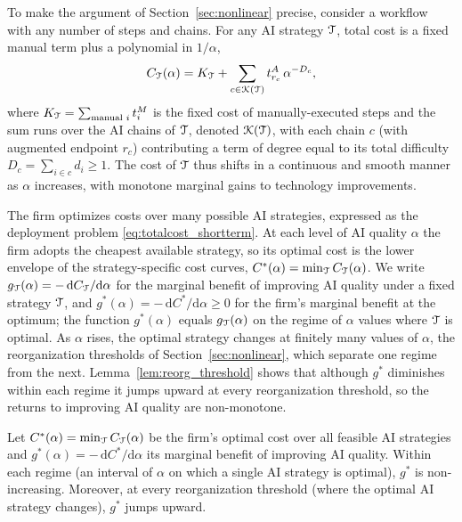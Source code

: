 To make the argument of Section~\ref{sec:nonlinear} precise, consider a workflow with any number of steps and chains.
For any AI strategy $\mathcal{T}$, total cost is a fixed manual term plus a polynomial in $1/\alpha$,
\begin{equation}
\label{eq:strategy_cost}
C_{\mathcal{T}}(\alpha) = K_{\mathcal{T}} + \sum_{c \in \mathcal{K}(\mathcal{T})} t^{A}_{r_c}\,\alpha^{-D_c},
\end{equation}
where $K_{\mathcal{T}} = \sum_{\text{manual } i} t^{M}_{i}$ is the fixed cost of manually-executed steps and the sum runs over the AI chains of $\mathcal{T}$, denoted $\mathcal{K}(\mathcal{T})$, with each chain $c$ (with augmented endpoint $r_c$) contributing a term of degree equal to its total difficulty $D_c = \sum_{i \in c} d_i \ge 1$.
The cost of $\mathcal{T}$ thus shifts in a continuous and smooth manner as $\alpha$ increases, with monotone marginal gains to technology improvements.

The firm optimizes costs over many possible AI strategies, expressed as the deployment problem \eqref{eq:totalcost_shortterm}.
At each level of AI quality $\alpha$ the firm adopts the cheapest available strategy, so its optimal cost is the lower envelope of the strategy-specific cost curves, $C^*(\alpha) = \min_{\mathcal{T}} C_{\mathcal{T}}(\alpha)$.
We write $g_{\mathcal{T}}(\alpha) = -\,\mathrm{d}C_{\mathcal{T}}/\mathrm{d}\alpha$ for the marginal benefit of improving AI quality under a fixed strategy $\mathcal{T}$, and $g^*(\alpha) = -\,\mathrm{d}C^*/\mathrm{d}\alpha \ge 0$ for the firm's marginal benefit at the optimum; the function $g^*(\alpha)$ equals $g_{\mathcal{T}}(\alpha)$ on the regime of $\alpha$ values where $\mathcal{T}$ is optimal.
As $\alpha$ rises, the optimal strategy changes at finitely many values of $\alpha$, the reorganization thresholds of Section~\ref{sec:nonlinear}, which separate one regime from the next.
Lemma~\ref{lem:reorg_threshold} shows that although $g^*$ diminishes within each regime it jumps upward at every reorganization threshold, so the returns to improving AI quality are non-monotone.

\begin{lem}
\label{lem:reorg_threshold}
Let $C^*(\alpha) = \min_{\mathcal{T}} C_{\mathcal{T}}(\alpha)$ be the firm's optimal cost over all feasible AI strategies and $g^*(\alpha) = -\,\mathrm{d}C^*/\mathrm{d}\alpha$ its marginal benefit of improving AI quality.
Within each regime (an interval of $\alpha$ on which a single AI strategy is optimal), $g^*$ is non-increasing.
Moreover, at every reorganization threshold (where the optimal AI strategy changes), $g^*$ jumps upward.
\end{lem}

